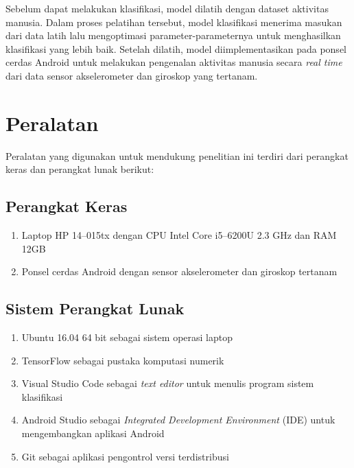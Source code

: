 Sebelum dapat melakukan klasifikasi, model dilatih dengan dataset aktivitas manusia. Dalam proses pelatihan tersebut, model klasifikasi menerima masukan dari data latih lalu mengoptimasi parameter-parameternya untuk menghasilkan klasifikasi yang lebih baik. Setelah dilatih, model diimplementasikan pada ponsel cerdas Android untuk melakukan pengenalan aktivitas manusia secara \textit{real time} dari data sensor akselerometer dan giroskop yang tertanam.

\section{Peralatan}
Peralatan yang digunakan untuk mendukung penelitian ini terdiri dari perangkat keras dan perangkat lunak berikut:

\subsection{Perangkat Keras}
\begin{enumerate}
    \item Laptop HP 14--015tx dengan CPU Intel Core i5--6200U 2.3 GHz dan RAM 12GB
    \item Ponsel cerdas Android dengan sensor akselerometer dan giroskop tertanam
\end{enumerate}

\subsection{Sistem Perangkat Lunak}
\begin{enumerate}
    \item Ubuntu 16.04 64 bit sebagai sistem operasi laptop
    \item TensorFlow sebagai pustaka komputasi numerik
    \item Visual Studio Code sebagai \textit{text editor} untuk menulis program sistem klasifikasi
    \item Android Studio sebagai \textit{Integrated Development Environment} (IDE) untuk mengembangkan aplikasi Android
    \item Git sebagai aplikasi pengontrol versi terdistribusi
\end{enumerate}

%
%
